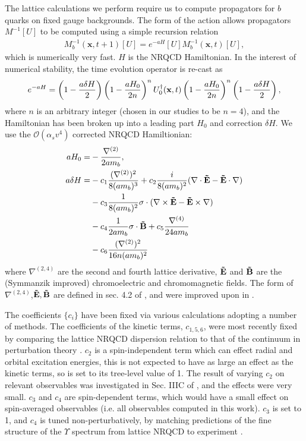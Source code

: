     The lattice calculations we perform require us to compute propagators for $b$ quarks on fixed gauge backgrounds. The form of the action allows propagators $M^{-1}[U]$ to be computed using a simple recursion relation
    \begin{align}
      M_b^{-1}({\textbf{x}},t+1)[U] = e^{-aH}[U] M^{-1}_b({\textbf{x}},t)[U],
      \label{eq:nrqcd_recursion}
    \end{align}
    which is numerically very fast. $H$ is the NRQCD Hamiltonian. In the interest of numerical stability, the time evolution operator is re-cast as
    \begin{align}
      e^{-aH} = \left(1 - {a\delta H\over 2}\right)\left(1-{aH_0\over 2 n}\right)^n U_0^{\dagger}({\textbf{x}},t) \left(1 - {aH_0\over 2n}\right)^n \left(1-{a\delta H\over 2}\right),
    \end{align}
    where $n$ is an arbitrary integer (chosen in our studies to be $n=4$), and the Hamiltonian has been broken up into a leading part $H_0$ and correction $\delta H$. We use the $\mathcal{O}(\alpha_s v^4)$ corrected NRQCD Hamiltionian:
    \begin{align}
      aH_0 =& - {\nabla^{(2)}\over 2am_b} , \\
      \nonumber
      a\delta H =& - c_1 {(\nabla^{(2)})^2 \over 8 (am_b)^3} + c_2{ i\over 8(am_b)^2} ( \nabla\cdot {\bf{\tilde{E}}} - {\bf{\tilde{E}}}\cdot \nabla) \\
      \nonumber
      & - c_3 {1\over 8(am_b)^2} \sigma\cdot ( \nabla\times{\bf{\tilde{E}}} - {\bf{\tilde{E}}}\times\nabla) \\
      \nonumber
      & - c_4 {1\over 2am_b} \sigma\cdot {\bf{\tilde{B}}} + c_5 {\nabla^{(4)}\over 24 am_b} \\
      & - c_6 {(\nabla^{(2)})^2\over 16n (am_b)^2}
    \end{align}
    where $\nabla^{(2,4)}$ are the second and fourth lattice derivative, ${\bf{\tilde{E}}}$ and ${\bf{\tilde{B}}}$ are the (Symmanzik improved) chromoelectric and chromomagnetic fields. The form of $\nabla^{(2,4)}$,${\bf{\tilde{E}}},{\bf{\tilde{B}}}$ are defined in sec. 4.2 of \cite{Lepage:1992tx}, and were improved upon in \cite{Gray:2005ur}.

    The coefficients $\{c_i\}$ have been fixed via various calculations adopting a number of methods. The coefficients of the kinetic terms, $c_{1,5,6}$, were most recently fixed by comparing the lattice NRQCD dispersion relation to that of the continuum in perturbation theory \cite{Davies:2018fwg}. $c_2$ is a spin-independent term which can effect radial and orbital excitation energies, this is not expected to have as large an effect as the kinetic terms, so is set to its tree-level value of 1. The result of varying $c_2$ on relevant observables was investigated in Sec. IIIC of \cite{Dowdall:2011wh}, and the effects were very small. $c_3$ and $c_4$ are spin-dependent terms, which would have a small effect on spin-averaged observables (i.e. all observables computed in this work). $c_3$ is set to 1, and $c_4$ is tuned non-perturbatively, by matching predictions of the fine structure of the $\Upsilon$ spectrum from lattice NRQCD to experiment \cite{Dowdall:2011wh}.

